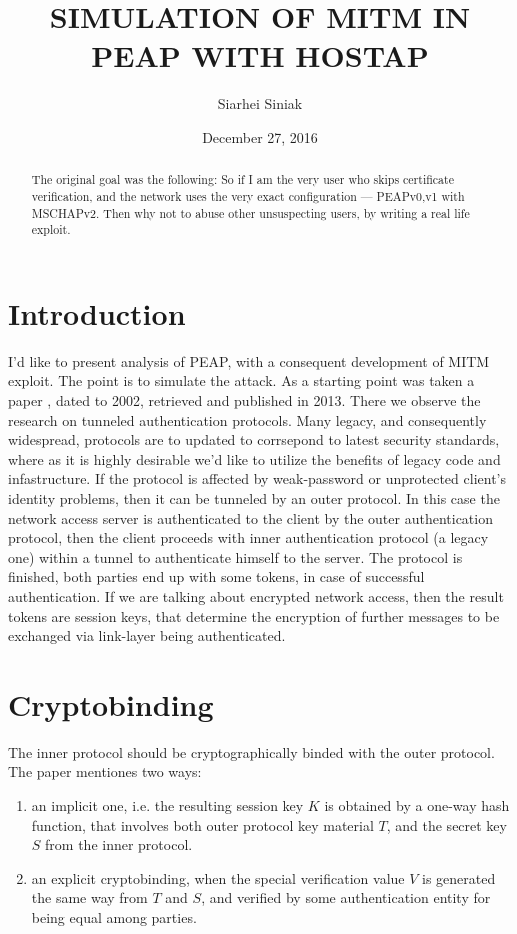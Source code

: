 \documentclass{amsart}
\begin{document}
\title{SIMULATION OF MITM IN PEAP WITH HOSTAP}

\date{December 27, 2016}

\author{Siarhei Siniak}

\begin{abstract}
  The original goal was the following:
  So if I am the very user who skips certificate verification,
  and the network uses the very exact configuration
  --- PEAPv0,v1 with MSCHAPv2.
  Then why not to abuse other unsuspecting users,
  by writing a real life exploit.
\end{abstract}

\maketitle

\section{Introduction}

I'd like to present analysis of PEAP,
with a consequent development of MITM exploit.
The point is to simulate the attack.
As a starting point was taken a paper \cite{tap2002},
dated to 2002, retrieved and published in 2013.
There we observe the research on tunneled authentication protocols.
Many legacy, and consequently widespread,
protocols are to updated to corrsepond
to latest security standards, where as it is highly desirable
we'd like to utilize the benefits of legacy code and infastructure.
If the protocol is affected by weak-password
or unprotected client's identity problems, then it can be
tunneled by an outer protocol.
In this case the network access server
is authenticated to the client by the outer authentication protocol,
then the client proceeds with inner authentication protocol
(a legacy one) within a tunnel to authenticate himself to the server.
The protocol is finished, both parties end up with some tokens,
in case of successful authentication.
If we are talking about encrypted network access,
then the result tokens are session keys,
that determine the encryption of further
messages to be exchanged via link-layer
being authenticated.

\section{Cryptobinding}
The inner protocol should be cryptographically binded
with the outer protocol.
The paper \cite{tap2002} mentiones two ways:
\begin{enumerate}
  \item an implicit one, i.e. the resulting session key $K$ is obtained
    by a one-way hash function, that involves both outer protocol
    key material $T$,
    and the secret key $S$ from the inner protocol.
  \item an explicit cryptobinding, when the special verification value $V$
    is generated the same way from $T$ and $S$,
    and verified by some authentication entity for being equal among parties.
\end{enumerate}
\end{document}
